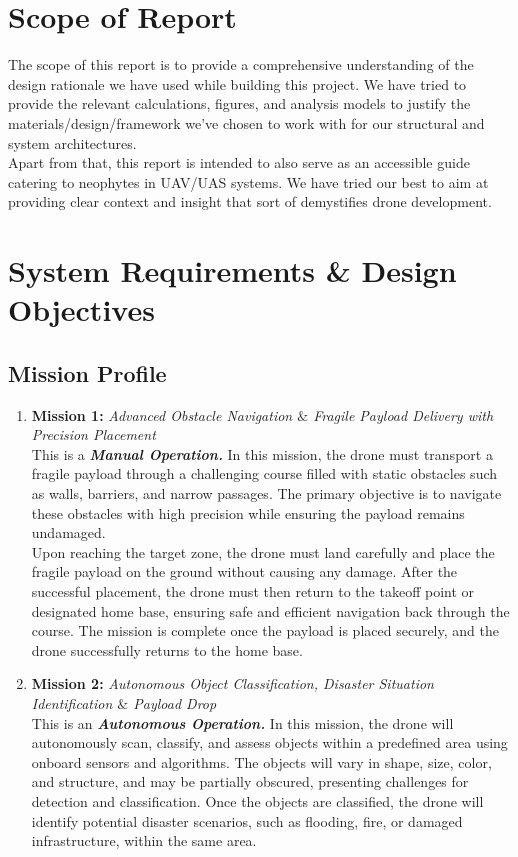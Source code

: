 \documentclass[12pt]{report}
\begin{document}
    \section{Scope of Report}
    The scope of this report is to provide a comprehensive understanding of the design rationale we have used while building this project. We have tried to provide the relevant calculations, figures, and analysis models to justify the materials/design/framework we've chosen to work with for our structural and system architectures. \\ 

    \noindent Apart from that, this report is intended to also serve as an accessible guide catering to neophytes in UAV/UAS systems. We have tried our best to aim at providing clear context and insight that sort of demystifies drone development. \\

  \section{System Requirements \& Design Objectives}
    \subsection{Mission Profile}
    \begin{enumerate}
      \item \textbf{Mission 1:} \textit{Advanced Obstacle Navigation $\&$ Fragile Payload Delivery with Precision Placement} \\
        This is a \textbf{\textit{Manual Operation.}} In this mission, the drone must transport a fragile payload through a challenging course filled with static obstacles such as walls, barriers, and narrow passages. The primary objective is to navigate these obstacles with high precision while ensuring the payload remains undamaged. \\
        
        Upon reaching the target zone, the drone must land carefully and place the fragile payload on the ground without causing any damage. After the successful placement, the drone must then return to the takeoff point or designated home base, ensuring safe and efficient navigation back through the course. The mission is complete once the payload is placed securely, and the drone successfully returns to the home base.
      \item \textbf{Mission 2:} \textit{Autonomous Object Classification, Disaster Situation Identification $\&$ Payload Drop }\\
        This is an \textbf{\textit{Autonomous Operation.}} In this mission, the drone will autonomously scan, classify, and assess objects within a predefined area using onboard sensors and algorithms. The objects will vary in shape, size, color, and structure, and may be partially obscured, presenting challenges for detection and classification. Once the objects are classified, the drone will identify potential disaster scenarios, such as flooding, fire, or damaged infrastructure, within the same area.
    \end{enumerate}
\end{document}

